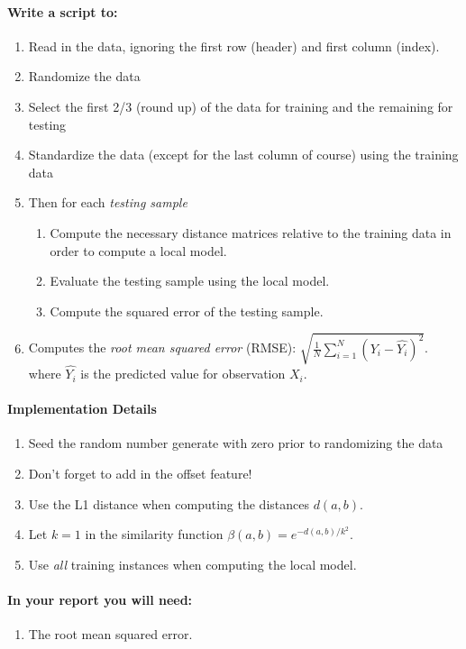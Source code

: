 \documentclass[12pt]{article}
\begin{document}
\paragraph{Write a script to:}
\begin{enumerate}
  \item Read in the data, ignoring the first row (header) and first column (index).
  \item Randomize the data
  \item Select the first 2/3 (round up) of the data for training and the remaining for testing
  \item Standardize the data (except for the last column of course) using the training data
  \item Then for each \emph{testing sample}
  	\begin{enumerate}
  	\item Compute the necessary distance matrices relative to the training data in order to compute a local model.
  	\item Evaluate the testing sample using the local model.
  	\item Compute the squared error of the testing sample.
  	\end{enumerate}
 \item Computes the \emph{root mean squared error} (RMSE): $\sqrt{\frac{1}{N}\sum_{i=1}^N (Y_i-\hat{Y_i})^2}$. where $\hat{Y_i}$ is the predicted value for observation $X_i$.
\end{enumerate}


\paragraph{Implementation Details}
\begin{enumerate}
\item Seed the random number generate with zero prior to randomizing the data
\item Don't forget to add in the offset feature!
\item Use the L1 distance when computing the distances $d(a,b)$.
\item Let $k=1$ in the similarity function $\beta(a,b)= e^{-d(a,b)/k^2}$.
\item Use \emph{all} training instances when computing the local model.
\end{enumerate}


\paragraph{In your report you will need:}
\begin{enumerate}
\item The root mean squared error.
\end{enumerate}
\end{document}

